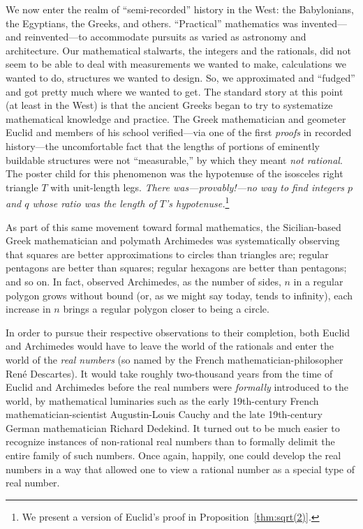 We now enter the realm of ``semi-recorded'' history in the West: the
Babylonians, the Egyptians, the Greeks, and others.  ``Practical''
mathematics was invented---and reinvented---to accommodate pursuits as
varied as astronomy and architecture.  Our mathematical stalwarts, the
integers and the rationals, did not seem to be able to deal with
measurements we wanted to make, calculations we wanted to do,
structures we wanted to design.  So, we approximated and ``fudged''
and got pretty much where we wanted to get.  The standard story at this
point (at least in the West) is that the ancient Greeks began to try
to systematize mathematical knowledge and practice.  The Greek
mathematician and geometer Euclid
%
and members of his school verified---via one of the first {\em proofs}
in recorded history---the uncomfortable fact that the lengths of
portions of eminently buildable structures were not ``measurable,'' by
which they meant {\em not rational}.  The poster child for this
phenomenon was the hypotenuse of the isosceles right triangle $T$ with
unit-length legs.  {\em There was---provably!---no way to find
  integers $p$ and $q$ whose ratio was the length of $T$'s
  hypotenuse.}\footnote{We present a version of Euclid's proof in
  Proposition~\ref{thm:sqrt(2)}.}

As part of this same movement toward formal mathematics, the
Sicilian-based Greek mathematician and polymath Archimedes
%
was systematically observing that squares are better approximations to
circles than triangles are; regular pentagons are better than squares;
regular hexagons are better than pentagons; and so on.  In fact,
observed Archimedes, as the number of sides, $n$ in a regular polygon
grows without bound (or, as we might say today, tends to infinity),
each increase in $n$ brings a regular polygon closer to being a circle.  

In order to pursue their respective observations to their completion,
both Euclid and Archimedes would have to leave the world of the
rationals and enter the world of the {\it real numbers}
(so named by the French mathematician-philosopher Ren\'{e} Descartes).
It would take roughly two-thousand years from the time of Euclid and
Archimedes before the real numbers were {\em formally} introduced to
the world, by mathematical luminaries such as the early 19th-century
French mathematician-scientist Augustin-Louis Cauchy
and the late 19th-century German mathematician Richard Dedekind.
It turned out to be much easier to recognize instances of non-rational
real numbers than to formally delimit the entire family of such
numbers.  Once again, happily, one could develop the real numbers in a
way that allowed one to view a rational number as a special type of
real number.  

